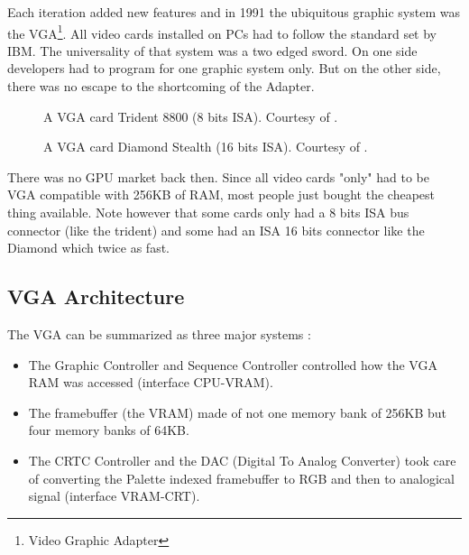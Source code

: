 \documentclass[book.tex]{subfiles}
\begin{document}
Each iteration added new features and in 1991 the ubiquitous graphic system was the VGA\footnote{Video Graphic Adapter}. All video cards installed on PCs had to follow the standard set by IBM. The universality of that system was a two edged sword. On one side developers had to program for one graphic system only. But on the other side, there was no escape to the shortcoming of the Adapter.\\

\begin{figure}[H] 
  \centering 
  \caption{A VGA card Trident 8800 (8 bits ISA). Courtesy of .}
\end{figure}
\par
\begin{figure}[H] 
  \centering 
  \caption{A VGA card Diamond Stealth (16 bits ISA). Courtesy of .}
\end{figure}
 There was no GPU market back then. Since all video cards "only" had to be VGA compatible with 256KB of RAM, most people just bought the cheapest thing available. Note however that some cards only had a 8 bits ISA bus connector (like the trident) and some had an ISA 16 bits connector like the Diamond which twice as fast.\\
\par




\subsection{VGA Architecture}

The VGA can be summarized as three major systems :

\begin{itemize}
\item The Graphic Controller and Sequence Controller controlled how the VGA RAM was accessed (interface CPU-VRAM).
\item The framebuffer (the VRAM) made of not one memory bank of 256KB but four memory banks of 64KB.
\item The CRTC Controller and the DAC (Digital To Analog Converter) took care of converting the Palette indexed framebuffer to RGB and then to analogical signal (interface VRAM-CRT).
\end{itemize}
\end{document}
